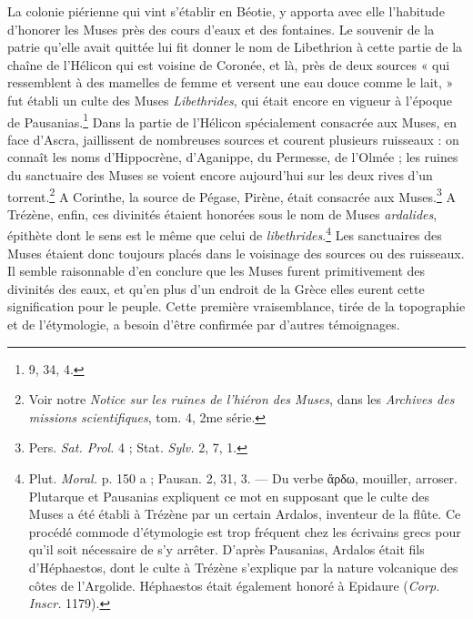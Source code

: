 \documentclass[a4paper, 11pt, oneside, polutonikogreek, french]{article}
\begin{document}
La colonie piérienne qui vint s'établir en Béotie, y apporta avec elle l'habitude d'honorer les Muses près des cours d'eaux et des fontaines. Le souvenir de la patrie qu'elle avait quittée lui fit donner le nom de Libethrion à cette partie de la chaîne de l'Hélicon qui est voisine de Coronée, et là, près de deux sources « qui ressemblent à des mamelles de femme et versent une eau douce comme le lait, » fut établi un culte des Muses \emph{Libethrides}, qui était encore en vigueur à l'époque de Pausanias.\footnote{9, 34, 4.} Dans la partie de l'Hélicon spécialement consacrée aux Muses, en face d'Ascra, jaillissent de nombreuses sources et courent plusieurs ruisseaux : on connaît les noms d'Hippocrène, d'Aganippe, du Permesse, de l'Olmée ; les ruines du sanctuaire des Muses se voient encore aujourd'hui sur les deux rives d'un torrent.\footnote{Voir notre \emph{Notice sur les ruines de l'hiéron des Muses}, dans les \emph{Archives des missions scientifiques}, tom. 4, 2me série.} A Corinthe, la source de Pégase, Pirène, était consacrée aux Muses.\footnote{Pers. \emph{Sat. Prol.} 4 ; Stat. \emph{Sylv.} 2, 7, 1.} A Trézène, enfin, ces divinités étaient honorées sous le nom de Muses \emph{ardalides}, épithète dont le sens est le même que celui de \emph{libethrides}.\footnote{Plut. \emph{Moral.} p. 150 a ; Pausan. 2, 31, 3. --- Du verbe ἄρδω, mouiller, arroser. Plutarque et Pausanias expliquent ce mot en supposant que le culte des Muses a été établi à Trézène par un certain Ardalos, inventeur de la flûte. Ce procédé commode d'étymologie est trop fréquent chez les écrivains grecs pour qu'il soit nécessaire de s'y arrêter. D'après Pausanias, Ardalos était fils d'Héphaestos, dont le culte à Trézène s'explique par la nature volcanique des côtes de l'Argolide. Héphaestos était également honoré à Epidaure (\emph{Corp. Inscr.} 1179).} Les sanctuaires des Muses étaient donc toujours placés dans le voisinage des sources ou des ruisseaux. Il semble raisonnable d'en conclure que les Muses furent primitivement des divinités des eaux, et qu'en plus d'un endroit de la Grèce elles eurent cette signification pour le peuple. Cette première vraisemblance, tirée de la topographie et de l'étymologie, a besoin d'être confirmée par d'autres témoignages.
\end{document}
